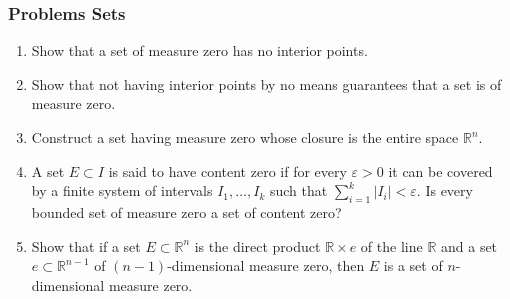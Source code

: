 \documentclass{Math_Note}
\begin{document}
\subsubsection{Problems Sets}
\begin{prb}
\begin{enumerate}
  \item[a)] Show that a set of measure zero has no interior points.
  \item[b)] Show that not having interior points by no means guarantees that a set is of measure zero.
  \item[c)] Construct a set having measure zero whose closure is the entire space $\mathbb{R}^n$.
  \item[d)] A set $E \subset I$ is said to have content zero if for every $\varepsilon > 0$ it can be covered by a finite system of intervals $I_1, \ldots, I_k$ such that $\sum_{i=1}^k |I_i| < \varepsilon$. Is every bounded set of measure zero a set of content zero?
  \item[e)] Show that if a set $E \subset \mathbb{R}^n$ is the direct product $\mathbb{R} \times e$ of the line $\mathbb{R}$ and a set $e \subset \mathbb{R}^{n-1}$ of $(n-1)$-dimensional measure zero, then $E$ is a set of $n$-dimensional measure zero.
\end{enumerate}
\end{prb}
\end{document}
